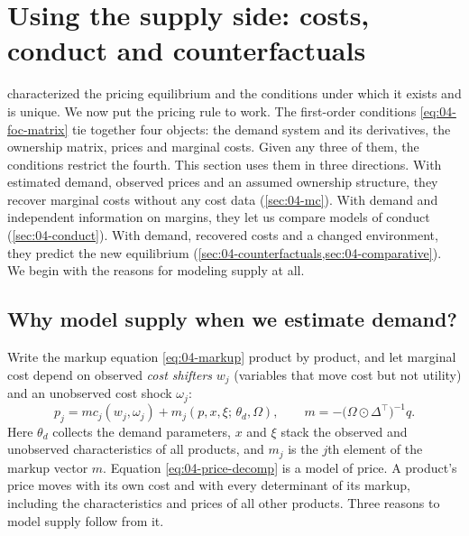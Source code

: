\section{Using the supply side: costs, conduct and counterfactuals}\label{sec:04-supply}

 characterized the pricing equilibrium and the conditions
under which it exists and is unique. We now put the pricing rule to work. The first-order conditions
\eqref{eq:04-foc-matrix} tie together four objects: the demand system and its
derivatives, the ownership matrix, prices and marginal costs. Given any three of them, the conditions restrict
the fourth. This section uses them in three directions. With estimated demand, observed prices and an assumed
ownership structure, they recover marginal costs without any cost data (\cref{sec:04-mc}). With demand and
independent information on margins, they let us compare models of conduct (\cref{sec:04-conduct}). With
demand, recovered costs and a changed environment, they predict the new equilibrium
(\cref{sec:04-counterfactuals,sec:04-comparative}). We begin with the reasons for modeling supply at all.

\subsection{Why model supply when we estimate demand?}\label{sec:04-supply-why}

Write the markup equation \eqref{eq:04-markup} product by product, and let marginal cost depend on observed
\emph{cost shifters} $w_j$ (variables that move cost but not utility) and an unobserved cost shock $\omega_j$:
\begin{equation}\label{eq:04-price-decomp}
p_j = mc_j(w_j, \omega_j) + m_j(p, x, \xi;\, \theta_d, \Omega),
\qquad m = -\big(\Omega \odot \Delta^\top\big)^{-1} q .
\end{equation}
Here $\theta_d$ collects the demand parameters, $x$ and $\xi$ stack the observed and unobserved characteristics
of all products, and $m_j$ is the $j$th element of the markup vector $m$. Equation \eqref{eq:04-price-decomp} is
a model of price. A product's price moves with its own cost and with every determinant of its markup, including
the characteristics and prices of all other products. Three reasons to model supply follow from it.

